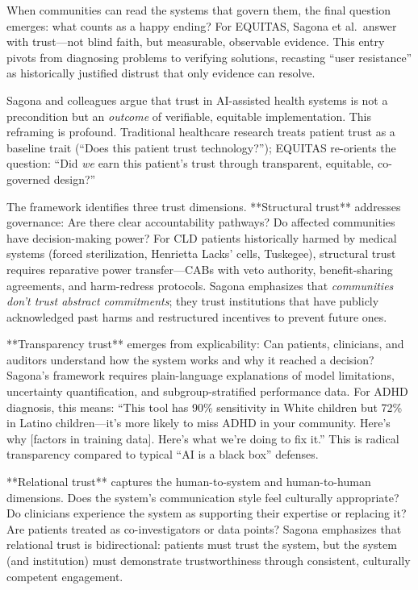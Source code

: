 \documentclass[12pt,twoside]{article}
\begin{document}
When communities can read the systems that govern them, the final question emerges: what counts as a happy ending? For EQUITAS, Sagona et al.\ answer with trust---not blind faith, but measurable, observable evidence. This entry pivots from diagnosing problems to verifying solutions, recasting ``user resistance'' as historically justified distrust that only evidence can resolve.

Sagona and colleagues argue that trust in AI-assisted health systems is not a precondition but an \emph{outcome} of verifiable, equitable implementation. This reframing is profound. Traditional healthcare research treats patient trust as a baseline trait (``Does this patient trust technology?''); EQUITAS re-orients the question: ``Did \emph{we} earn this patient's trust through transparent, equitable, co-governed design?''

The framework identifies three trust dimensions. **Structural trust** addresses governance: Are there clear accountability pathways? Do affected communities have decision-making power? For CLD patients historically harmed by medical systems (forced sterilization, Henrietta Lacks' cells, Tuskegee), structural trust requires reparative power transfer---CABs with veto authority, benefit-sharing agreements, and harm-redress protocols. Sagona emphasizes that \emph{communities don't trust abstract commitments}; they trust institutions that have publicly acknowledged past harms and restructured incentives to prevent future ones.

**Transparency trust** emerges from explicability: Can patients, clinicians, and auditors understand how the system works and why it reached a decision? Sagona's framework requires plain-language explanations of model limitations, uncertainty quantification, and subgroup-stratified performance data. For ADHD diagnosis, this means: ``This tool has 90\% sensitivity in White children but 72\% in Latino children---it's more likely to miss ADHD in your community. Here's why [factors in training data]. Here's what we're doing to fix it.'' This is radical transparency compared to typical ``AI is a black box'' defenses.

**Relational trust** captures the human-to-system and human-to-human dimensions. Does the system's communication style feel culturally appropriate? Do clinicians experience the system as supporting their expertise or replacing it? Are patients treated as co-investigators or data points? Sagona emphasizes that relational trust is bidirectional: patients must trust the system, but the system (and institution) must demonstrate trustworthiness through consistent, culturally competent engagement.
\end{document}
